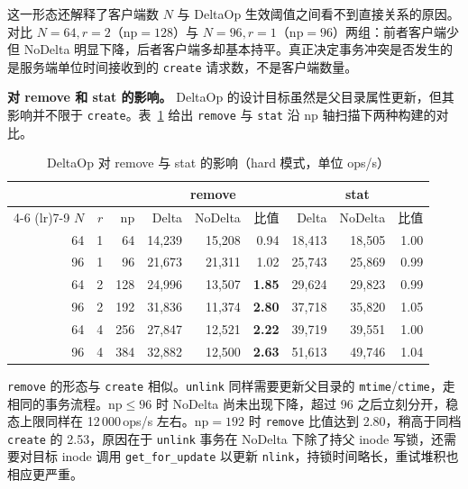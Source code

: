 这一形态还解释了客户端数 $N$ 与 DeltaOp 生效阈值之间看不到直接关系的原因。对比 $N=64, r=2$（$\mathrm{np}=128$）与 $N=96, r=1$（$\mathrm{np}=96$）两组：前者客户端少但 NoDelta 明显下降，后者客户端多却基本持平。真正决定事务冲突是否发生的是服务端单位时间接收到的 \texttt{create} 请求数，不是客户端数量。

\textbf{对 remove 和 stat 的影响。} DeltaOp 的设计目标虽然是父目录属性更新，但其影响并不限于 \texttt{create}。表~\ref{tab:delta-impact-other} 给出 \texttt{remove} 与 \texttt{stat} 沿 $\mathrm{np}$ 轴扫描下两种构建的对比。

\begin{table}[htbp]
    \centering
    \caption{DeltaOp 对 remove 与 stat 的影响（hard 模式，单位 ops/s）}
    \label{tab:delta-impact-other}
    \small
    \begin{tabular}{rrrrrrrrr}
        \toprule
        & & & \multicolumn{3}{c}{remove} & \multicolumn{3}{c}{stat} \\
        \cmidrule(lr){4-6} \cmidrule(lr){7-9}
        $N$ & $r$ & $\mathrm{np}$ & Delta & NoDelta & 比值 & Delta & NoDelta & 比值 \\
        \midrule
        64 & 1 & 64  & 14{,}239 & 15{,}208 & 0.94          & 18{,}413 & 18{,}505 & 1.00 \\
        96 & 1 & 96  & 21{,}673 & 21{,}311 & 1.02          & 25{,}743 & 25{,}869 & 0.99 \\
        64 & 2 & 128 & 24{,}996 & 13{,}507 & \textbf{1.85} & 29{,}624 & 29{,}823 & 0.99 \\
        96 & 2 & 192 & 31{,}836 & 11{,}374 & \textbf{2.80} & 37{,}718 & 35{,}820 & 1.05 \\
        64 & 4 & 256 & 27{,}847 & 12{,}521 & \textbf{2.22} & 39{,}719 & 39{,}551 & 1.00 \\
        96 & 4 & 384 & 32{,}882 & 12{,}500 & \textbf{2.63} & 51{,}613 & 49{,}746 & 1.04 \\
        \bottomrule
    \end{tabular}
\end{table}

\texttt{remove} 的形态与 \texttt{create} 相似。\texttt{unlink} 同样需要更新父目录的 \texttt{mtime}/\texttt{ctime}，走相同的事务流程。$\mathrm{np} \leq 96$ 时 NoDelta 尚未出现下降，超过 96 之后立刻分开，稳态上限同样在 12\,000\,ops/s 左右。$\mathrm{np}=192$ 时 \texttt{remove} 比值达到 2.80，稍高于同档 \texttt{create} 的 2.53，原因在于 \texttt{unlink} 事务在 NoDelta 下除了持父 inode 写锁，还需要对目标 inode 调用 \texttt{get\_for\_update} 以更新 \texttt{nlink}，持锁时间略长，重试堆积也相应更严重。

